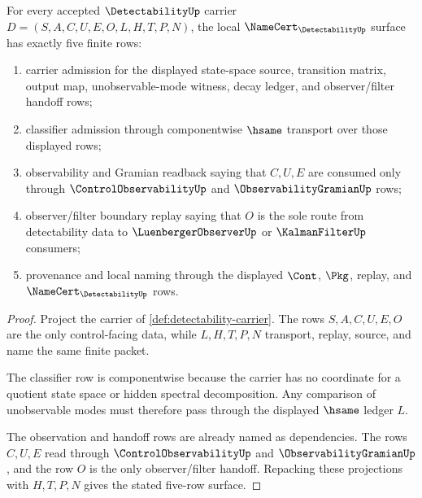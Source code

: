 \begin{theorem}
\label{thm:detectability-namecert-obligations}
For every accepted $\DetectabilityUp$ carrier $D=(S,A,C,U,E,O,L,H,T,P,N)$, the local $\NameCert_{\DetectabilityUp}$ surface has exactly five finite rows:
\begin{enumerate}
\item carrier admission for the displayed state-space source, transition matrix, output map, unobservable-mode witness, decay ledger, and observer/filter handoff rows;
\item classifier admission through componentwise $\hsame$ transport over those displayed rows;
\item observability and Gramian readback saying that $C,U,E$ are consumed only through $\ControlObservabilityUp$ and $\ObservabilityGramianUp$ rows;
\item observer/filter boundary replay saying that $O$ is the sole route from detectability data to $\LuenbergerObserverUp$ or $\KalmanFilterUp$ consumers;
\item provenance and local naming through the displayed $\Cont$, $\Pkg$, replay, and $\NameCert_{\DetectabilityUp}$ rows.
\end{enumerate}
\end{theorem}
\begin{proof}
Project the carrier of \autoref{def:detectability-carrier}. The rows $S,A,C,U,E,O$ are the only control-facing data, while $L,H,T,P,N$ transport, replay, source, and name the same finite packet.

The classifier row is componentwise because the carrier has no coordinate for a quotient state space or hidden spectral decomposition. Any comparison of unobservable modes must therefore pass through the displayed $\hsame$ ledger $L$.

The observation and handoff rows are already named as dependencies. The rows $C,U,E$ read through $\ControlObservabilityUp$ and $\ObservabilityGramianUp$, and the row $O$ is the only observer/filter handoff. Repacking these projections with $H,T,P,N$ gives the stated five-row surface.
\end{proof}

